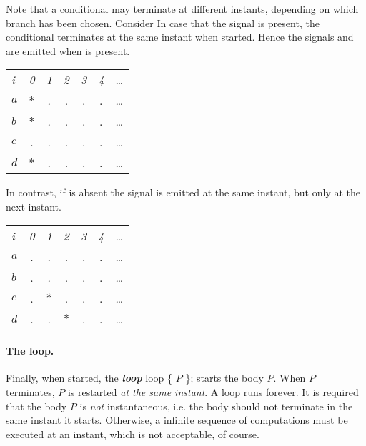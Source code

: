 Note that a conditional may terminate at different instants, depending on
which branch has been chosen. Consider
%
%
In case that the signal  is present, the conditional terminates at the same instant when started. Hence the signals  and  are emitted when  is present.
\begin{center}
  \leavevmode
  \begin{tabular}[]{l@{\quad}||@{\quad} cccccc}
    \hline\hline   
     \hbox{{\footnotesize \textit{i}}} &{\footnotesize \textit{0}}
     &{\footnotesize \textit{1}}&{\footnotesize \textit{2}}
     &{\footnotesize \textit{3}}&{\footnotesize \textit{4}}&\ldots
   \\  
    \hbox{$a$} &$*$&.&.&.&.&\ldots
   \\
    \hbox{$b$} &$*$&.&.&.&.&\ldots
   \\
    \hbox{$c$} &.&.&.&.&.&\ldots
   \\
    \hbox{$d$} &$*$&.&.&.&.&\ldots
  \\   \hline\hline
  \end{tabular}
\end{center} 
In contrast, if  is absent the signal  is emitted at the same instant, but  only at the next instant.
\begin{center}
  \leavevmode
  \begin{tabular}[]{l@{\quad}||@{\quad} cccccc}
    \hline\hline   
     \hbox{{\footnotesize \textit{i}}} &{\footnotesize \textit{0}}
     &{\footnotesize \textit{1}}&{\footnotesize \textit{2}}
     &{\footnotesize \textit{3}}&{\footnotesize \textit{4}}&\ldots
   \\  
    \hbox{$a$} &.&.&.&.&.&\ldots
   \\
    \hbox{$b$} &.&.&.&.&.&\ldots
   \\
    \hbox{$c$} &.&$*$&.&.&.&\ldots
   \\
    \hbox{$d$} &.&.&$*$&.&.&\ldots
  \\   \hline\hline
  \end{tabular}
\end{center} 

\paragraph{The loop.}

Finally, when started, the \textbf{\emph{loop}}
% 
\BEP
                     loop \{ $P$ \};
\EEP
% 
starts the body $P$.  When $P$ terminates, $P$ is restarted \emph{at the
same instant}.  A loop runs forever.  It is required that the body $P$
is \emph{not} instantaneous, i.e. the body should not terminate in 
the same instant it starts.  Otherwise, a infinite sequence of 
computations must be executed at an instant, which is not acceptable, of course. 


